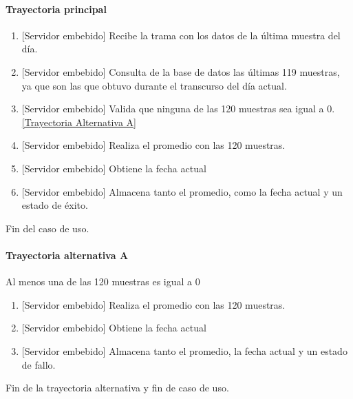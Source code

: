 \paragraph{Trayectoria principal}
	\begin{enumerate}
		\item {[Servidor embebido]} Recibe la trama con los datos de la última muestra del día.
		\item  {[Servidor embebido]} Consulta de la base de datos las últimas 119 muestras, ya que son las que obtuvo durante el transcurso del día actual.
		\item {[Servidor embebido]} Valida que ninguna de las 120 muestras sea igual a 0. \hyperref[SUB-M-CU1.1:TA]{[Trayectoria Alternativa A]}
		\item {[Servidor embebido]} Realiza el promedio con las 120 muestras.
		\item {[Servidor embebido]} Obtiene la fecha actual
		\item {[Servidor embebido]} Almacena tanto el promedio, como la fecha actual y un estado de éxito.
	\end{enumerate}
	Fin del caso de uso.

\paragraph{Trayectoria alternativa A} \label{SUB-M-CU1.1:TA}
	Al menos una de las 120 muestras es igual a 0
	\begin{enumerate}[label=A\arabic*.]
		\item {[Servidor embebido]} Realiza el promedio con las 120 muestras.
		\item {[Servidor embebido]} Obtiene la fecha actual
		\item {[Servidor embebido]} Almacena tanto el promedio, la fecha actual y un estado de fallo.
	\end{enumerate}
	Fin de la trayectoria alternativa y fin de caso de uso.
